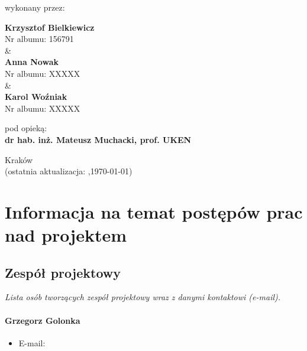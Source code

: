 \documentclass[12pt,a4paper,oneside]{article}
\theoremstyle{definition}
\numberwithin{equation}{section}
\begin{document}
\begin{titlepage}
\begin{center}
 {\fontsize{12pt}{12pt}\selectfont wykonany przez: }
\end{center}
\begin{center}
 {\bf\fontsize{16pt}{16pt}\selectfont Krzysztof Bielkiewicz}\\
 {\fontsize{12pt}{12pt}\selectfont Nr albumu: 156791 \\\&\\}
 {\bf\fontsize{16pt}{16pt}\selectfont Anna Nowak}\\
 {\fontsize{12pt}{12pt}\selectfont Nr albumu: XXXXX\\\&\\}
 {\bf\fontsize{16pt}{16pt}\selectfont Karol Woźniak}\\
 {\fontsize{12pt}{12pt}\selectfont Nr albumu: XXXXX}
\end{center}
\begin{center}
 {\fontsize{12pt}{12pt}\selectfont pod opieką:}\\
 {\bf\fontsize{12pt}{12pt}\selectfont dr hab. inż. Mateusz Muchacki, prof. UKEN}
\end{center}

\vspace*{\fill}
\begin{center}
\large
Kraków \the\year\\
(ostatnia aktualizacja: \DTMcurrenttime,\;\today)
\end{center}
\end{titlepage}
\setcounter{page}{0} 
\newpage\null\thispagestyle{empty}

\tableofcontents


\newpage

\section{Informacja na temat postępów prac nad projektem}

\subsection{Zespół projektowy}
\textit{Lista osób tworzących zespół projektowy wraz z danymi kontaktowi (e-mail).}
    \paragraph{Grzegorz Golonka}
    \begin{itemize}
        \item E-mail:
    \end{itemize}
\end{document}

